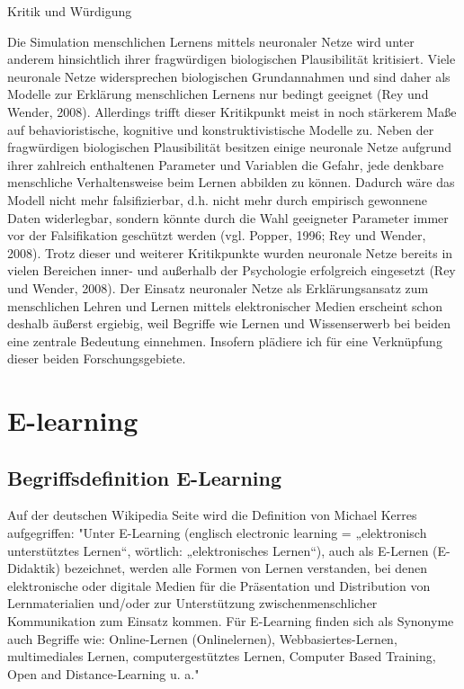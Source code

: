 \documentclass[a4paper, 12pt, twoside, BCOR=20mm, DIV=calc, abstracton, parskip=half*, toc=bibliography, toc=listof, headsepline, footsepline, headings=small, numbers=enddot]{scrreprt}
\begin{document}
	Kritik und Würdigung
	
	Die Simulation menschlichen Lernens mittels neuronaler Netze wird unter anderem hinsichtlich ihrer fragwürdigen biologischen Plausibilität kritisiert. Viele neuronale Netze widersprechen biologischen Grundannahmen und sind daher als Modelle zur Erklärung menschlichen Lernens nur bedingt geeignet (Rey und Wender, 2008). Allerdings trifft dieser Kritikpunkt meist in noch stärkerem Maße auf behavioristische, kognitive und konstruktivistische Modelle zu. Neben der fragwürdigen biologischen Plausibilität besitzen einige neuronale Netze aufgrund ihrer zahlreich enthaltenen Parameter und Variablen die Gefahr, jede denkbare menschliche Verhaltensweise beim Lernen abbilden zu können. Dadurch wäre das Modell nicht mehr falsifizierbar, d.h. nicht mehr durch empirisch gewonnene Daten widerlegbar, sondern könnte durch die Wahl geeigneter Parameter immer vor der Falsifikation geschützt werden (vgl. Popper, 1996; Rey und Wender, 2008). Trotz dieser und weiterer Kritikpunkte wurden neuronale Netze bereits in vielen Bereichen inner- und außerhalb der Psychologie erfolgreich eingesetzt (Rey und Wender, 2008). Der Einsatz neuronaler Netze als Erklärungsansatz zum menschlichen Lehren und Lernen mittels elektronischer Medien erscheint schon deshalb äußerst ergiebig, weil Begriffe wie Lernen und Wissenserwerb bei beiden eine zentrale Bedeutung einnehmen. Insofern plädiere ich für eine Verknüpfung dieser beiden Forschungsgebiete.
	
	\section{E-learning}
	\subsection{Begriffsdefinition E-Learning}
	Auf der deutschen Wikipedia Seite wird die Definition von Michael Kerres aufgegriffen:
	"Unter E-Learning (englisch electronic learning = „elektronisch unterstütztes Lernen“, wörtlich: „elektronisches Lernen“), auch als E-Lernen (E-Didaktik) bezeichnet, werden alle Formen von Lernen verstanden, bei denen elektronische oder digitale Medien für die Präsentation und Distribution von Lernmaterialien und/oder zur Unterstützung zwischenmenschlicher Kommunikation zum Einsatz kommen.
	Für E-Learning finden sich als Synonyme auch Begriffe wie: Online-Lernen (Onlinelernen), Webbasiertes-Lernen, multimediales Lernen, computergestütztes Lernen, Computer Based Training, Open and Distance-Learning u. a."\cite{kerres2005learning}
	
\end{document}
